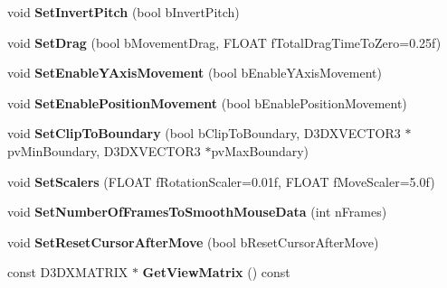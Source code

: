 \begin{DoxyCompactItemize}
\item 
\hypertarget{class_c_base_camera_ad76b241a4bf9ef386563fd1a38ef70ae}{void {\bfseries Set\+Invert\+Pitch} (bool b\+Invert\+Pitch)}\label{class_c_base_camera_ad76b241a4bf9ef386563fd1a38ef70ae}

\item 
\hypertarget{class_c_base_camera_a029f5a9a3e3555c94e8b88783a9d51f3}{void {\bfseries Set\+Drag} (bool b\+Movement\+Drag, F\+L\+O\+A\+T f\+Total\+Drag\+Time\+To\+Zero=0.\+25f)}\label{class_c_base_camera_a029f5a9a3e3555c94e8b88783a9d51f3}

\item 
\hypertarget{class_c_base_camera_a5eb76cd5ca8ee2b377cf7434ee718547}{void {\bfseries Set\+Enable\+Y\+Axis\+Movement} (bool b\+Enable\+Y\+Axis\+Movement)}\label{class_c_base_camera_a5eb76cd5ca8ee2b377cf7434ee718547}

\item 
\hypertarget{class_c_base_camera_a6f65efa814bda8435fb45cca7f9c1f32}{void {\bfseries Set\+Enable\+Position\+Movement} (bool b\+Enable\+Position\+Movement)}\label{class_c_base_camera_a6f65efa814bda8435fb45cca7f9c1f32}

\item 
\hypertarget{class_c_base_camera_a5e3ec99a05164a281f55a812b755a6da}{void {\bfseries Set\+Clip\+To\+Boundary} (bool b\+Clip\+To\+Boundary, D3\+D\+X\+V\+E\+C\+T\+O\+R3 $\ast$pv\+Min\+Boundary, D3\+D\+X\+V\+E\+C\+T\+O\+R3 $\ast$pv\+Max\+Boundary)}\label{class_c_base_camera_a5e3ec99a05164a281f55a812b755a6da}

\item 
\hypertarget{class_c_base_camera_a33c8df00f0f8d644744621ac7142d5f8}{void {\bfseries Set\+Scalers} (F\+L\+O\+A\+T f\+Rotation\+Scaler=0.\+01f, F\+L\+O\+A\+T f\+Move\+Scaler=5.\+0f)}\label{class_c_base_camera_a33c8df00f0f8d644744621ac7142d5f8}

\item 
\hypertarget{class_c_base_camera_a7cda8d85d13b016697b4c4e27d57e41c}{void {\bfseries Set\+Number\+Of\+Frames\+To\+Smooth\+Mouse\+Data} (int n\+Frames)}\label{class_c_base_camera_a7cda8d85d13b016697b4c4e27d57e41c}

\item 
\hypertarget{class_c_base_camera_a0440bafade1654e678fbee7e30129783}{void {\bfseries Set\+Reset\+Cursor\+After\+Move} (bool b\+Reset\+Cursor\+After\+Move)}\label{class_c_base_camera_a0440bafade1654e678fbee7e30129783}

\item 
\hypertarget{class_c_base_camera_a10c93bd976787aec5b71daecd3448047}{const D3\+D\+X\+M\+A\+T\+R\+I\+X $\ast$ {\bfseries Get\+View\+Matrix} () const }\label{class_c_base_camera_a10c93bd976787aec5b71daecd3448047}


\end{DoxyCompactItemize}
